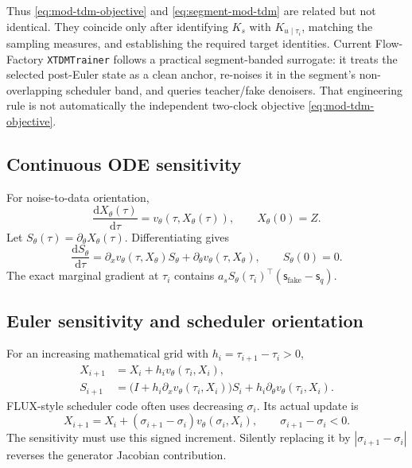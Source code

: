\documentclass[11pt,a4paper]{article}
\newcommand{\dd}{\mathrm{d}}
\newcommand{\fake}{\mathrm{fake}}
\newcommand{\score}{\mathsf{s}}
\theoremstyle{plain}
\theoremstyle{definition}
\begin{document}
Thus \eqref{eq:mod-tdm-objective} and \eqref{eq:segment-mod-tdm} are related but not identical.
They coincide only after identifying $K_s$ with $K_{u\mid\tau_i}$, matching the sampling
measures, and establishing the required target identities.  Current Flow-Factory
\texttt{XTDMTrainer} follows a practical segment-banded surrogate: it treats the selected
post-Euler state as a clean anchor, re-noises it in the segment's non-overlapping scheduler band,
and queries teacher/fake denoisers.  That engineering rule is not automatically the independent
two-clock objective \eqref{eq:mod-tdm-objective}.

\subsection{Continuous ODE sensitivity}

For noise-to-data orientation,
\begin{equation}
\frac{\dd X_\theta(\tau)}{\dd\tau}
=v_\theta(\tau,X_\theta(\tau)),
\qquad X_\theta(0)=Z.
\label{eq:student-ode}
\end{equation}
Let $S_\theta(\tau)=\partial_\theta X_\theta(\tau)$.  Differentiating gives
\begin{equation}
\frac{\dd S_\theta}{\dd\tau}
=\partial_xv_\theta(\tau,X_\theta)S_\theta
+\partial_\theta v_\theta(\tau,X_\theta),
\qquad S_\theta(0)=0.
\label{eq:continuous-sensitivity}
\end{equation}
The exact marginal gradient at $\tau_i$ contains
$a_sS_\theta(\tau_i)^\top(\score_{\fake}-\score_q)$.

\subsection{Euler sensitivity and scheduler orientation}

For an increasing mathematical grid with $h_i=\tau_{i+1}-\tau_i>0$,
\begin{align}
X_{i+1}&=X_i+h_iv_\theta(\tau_i,X_i),\label{eq:euler-state}\\
S_{i+1}
&=\bigl(I+h_i\partial_xv_\theta(\tau_i,X_i)\bigr)S_i
+h_i\partial_\theta v_\theta(\tau_i,X_i).
\label{eq:euler-sensitivity}
\end{align}
FLUX-style scheduler code often uses decreasing $\sigma_i$.  Its actual update is
\begin{equation}
X_{i+1}=X_i+(\sigma_{i+1}-\sigma_i)v_\theta(\sigma_i,X_i),
\qquad \sigma_{i+1}-\sigma_i<0.
\label{eq:scheduler-step}
\end{equation}
The sensitivity must use this signed increment.  Silently replacing it by
$|\sigma_{i+1}-\sigma_i|$ reverses the generator Jacobian contribution.
\end{document}
